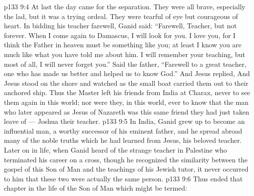 \vs p133 9:4 \pc At last the day came for the separation. They were all brave, especially the lad, but it was a trying ordeal. They were tearful of eye but courageous of heart. In bidding his teacher farewell, Ganid said: “Farewell, Teacher, but not forever. When I come again to Damascus, I will look for you. I love you, for I think the Father in heaven must be something like you; at least I know you are much like what you have told me about him. I will remember your teaching, but most of all, I will never forget you.” Said the father, “Farewell to a great teacher, one who has made us better and helped us to know God.” And Jesus replied,  And Jesus stood on the shore and watched as the small boat carried them out to their anchored ship. Thus the Master left his friends from India at Charax, never to see them again in this world; nor were they, in this world, ever to know that the man who later appeared as Jesus of Nazareth was this same friend they had just taken leave of --- Joshua their teacher.
\vs p133 9:5 In India, Ganid grew up to become an influential man, a worthy successor of his eminent father, and he spread abroad many of the noble truths which he had learned from Jesus, his beloved teacher. Later on in life, when Ganid heard of the strange teacher in Palestine who terminated his career on a cross, though he recognized the similarity between the gospel of this Son of Man and the teachings of his Jewish tutor, it never occurred to him that these two were actually the same person.
\vs p133 9:6 \pc Thus ended that chapter in the life of the Son of Man which might be termed: 
\quizlink
